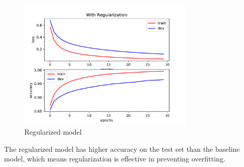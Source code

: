 \begin{answer}
    \begin{figure}[H]
        \centering
        \includegraphics[width=0.75\textwidth]{../src/mnist/regularized.pdf}
        \caption{Regularized model}
        \label{fig:regularized}
    \end{figure}
    The regularized model has higher accuracy on the test set than the baseline model,
    which means regularization is effective in preventing overfitting.
\end{answer}
   
  
